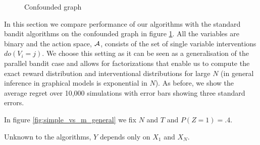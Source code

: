 
\begin{figure}
	\centering    
        \caption{Confounded graph}
        \label{fig:parallel_confounded} 
\end{figure}


In this section we compare performance of our algorithms with the standard bandit algorithms on the confounded graph in figure \ref{fig:parallel_confounded}. All the variables are binary and the action space, $\mathcal A$, consists of the set of single variable interventions $do(V_i = j)$. We choose this setting as it can be seen as a generalisation of the parallel bandit case and allows for factorizations that enable us to compute the exact reward distribution and interventional distributions for large $N$ (in general inference in graphical models is exponential in $N$). As before, we show the average regret over 10,000 simulations with error bars showing three standard errors. 

In figure \ref{fig:simple_vs_m_general} we fix $N$ and $T$ and $P(Z=1) = .4$. 


Unknown to the algorithms, $Y$ depends only on $X_1$ and $X_N$. 

